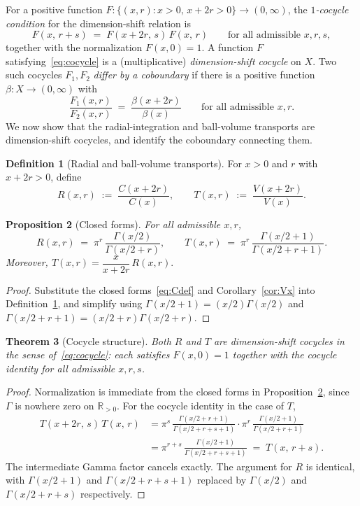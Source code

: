 \documentclass[11pt,a4paper]{article}
\theoremstyle{plain}
\newtheorem{theorem}{Theorem}[section]
\newtheorem{proposition}[theorem]{Proposition}
\theoremstyle{definition}
\newtheorem{definition}[theorem]{Definition}
\theoremstyle{remark}
\newcommand{\R}{\mathbb{R}}
\begin{document}
For a positive function $F\colon \{(x,r) : x>0,\,x+2r>0\}\to(0,\infty)$, the \emph{$1$-cocycle condition} for the dimension-shift relation is
\begin{equation}\label{eq:cocycle}
F(x,\,r+s) \;=\; F(x+2r,\,s)\,F(x,\,r)
\qquad\text{for all admissible } x,r,s,
\end{equation}
together with the normalization $F(x,0)=1$. A function $F$ satisfying~\eqref{eq:cocycle} is a (multiplicative) \emph{dimension-shift cocycle} on $X$. Two such cocycles $F_1, F_2$ \emph{differ by a coboundary} if there is a positive function $\beta\colon X\to(0,\infty)$ with
\begin{equation}\label{eq:coboundary}
\frac{F_1(x,r)}{F_2(x,r)} \;=\; \frac{\beta(x+2r)}{\beta(x)}
\qquad\text{for all admissible } x,r.
\end{equation}
We now show that the radial-integration and ball-volume transports are dimension-shift cocycles, and identify the coboundary connecting them.

\begin{definition}[Radial and ball-volume transports]\label{def:transports}
For $x>0$ and $r$ with $x+2r>0$, define
\[
R(x,r) \;:=\; \frac{C(x+2r)}{C(x)}, \qquad
T(x,r) \;:=\; \frac{V(x+2r)}{V(x)}.
\]
\end{definition}

\begin{proposition}[Closed forms]\label{prop:closedforms}
For all admissible $x,r$,
\[
R(x,r) \;=\; \pi^r\,\frac{\Gamma(x/2)}{\Gamma(x/2+r)}, \qquad
T(x,r) \;=\; \pi^r\,\frac{\Gamma(x/2+1)}{\Gamma(x/2+r+1)}.
\]
Moreover, $T(x,r) = \dfrac{x}{x+2r}\,R(x,r).$
\end{proposition}

\begin{proof}
Substitute the closed forms~\eqref{eq:Cdef} and Corollary~\ref{cor:Vx} into Definition~\ref{def:transports}, and simplify using $\Gamma(x/2+1)=(x/2)\Gamma(x/2)$ and $\Gamma(x/2+r+1)=(x/2+r)\Gamma(x/2+r)$.
\end{proof}

\begin{theorem}[Cocycle structure]\label{thm:cocycles}
Both $R$ and $T$ are dimension-shift cocycles in the sense of~\eqref{eq:cocycle}: each satisfies $F(x,0)=1$ together with the cocycle identity for all admissible $x,r,s$.
\end{theorem}

\begin{proof}
Normalization is immediate from the closed forms in Proposition~\ref{prop:closedforms}, since $\Gamma$ is nowhere zero on $\R_{>0}$. For the cocycle identity in the case of $T$,
\begin{align*}
T(x+2r,\,s)\,T(x,\,r)
&= \pi^s\,\frac{\Gamma(x/2+r+1)}{\Gamma(x/2+r+s+1)}\cdot\pi^r\,\frac{\Gamma(x/2+1)}{\Gamma(x/2+r+1)}\\
&= \pi^{r+s}\,\frac{\Gamma(x/2+1)}{\Gamma(x/2+r+s+1)} \;=\; T(x,\,r+s).
\end{align*}
The intermediate Gamma factor cancels exactly. The argument for $R$ is identical, with $\Gamma(x/2+1)$ and $\Gamma(x/2+r+s+1)$ replaced by $\Gamma(x/2)$ and $\Gamma(x/2+r+s)$ respectively.
\end{proof}
\end{document}
